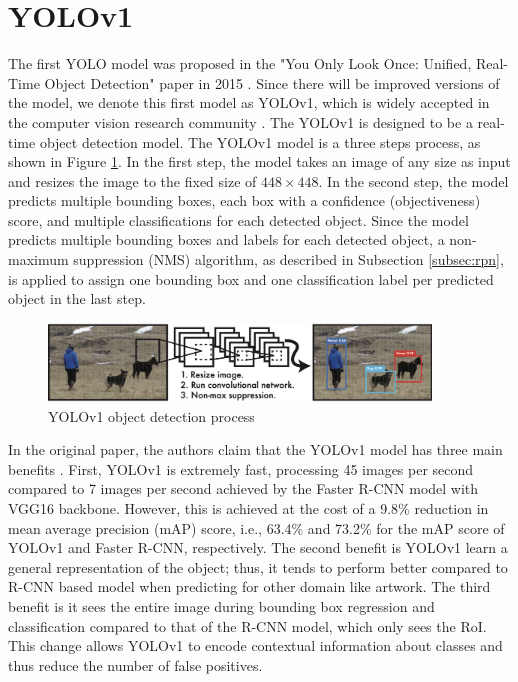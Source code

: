 \section{YOLOv1}  \label{sec:yolov1}

The first YOLO model was proposed in the "You Only Look Once: Uniﬁed, Real-Time Object Detection" paper in 2015 \cite{yolov1_2016}. Since there will be improved versions of the model, we denote this first model as YOLOv1, which is widely accepted in the computer vision research community \cite{understand_cnn_vs_yolo}. The YOLOv1 is designed to be a real-time object detection model. The YOLOv1 model is a three steps process, as shown in Figure \ref{fig:yolov1_process}. In the first step, the model takes an image of any size as input and resizes the image to the fixed size of $448 \times 448$. In the second step, the model predicts multiple bounding boxes, each box with a confidence (objectiveness) score, and multiple classifications for each detected object. Since the model predicts multiple bounding boxes and labels for each detected object, a non-maximum suppression (NMS) algorithm, as described in Subsection \ref{subsec:rpn}, is applied to assign one bounding box and one classification label per predicted object in the last step.

\begin{figure}[!ht]
    \centering
    \includegraphics[width=4in]{figures/yolov1_process.png}
    \caption{YOLOv1 object detection process \cite{yolov1_2016}} 
    \label{fig:yolov1_process}
\end{figure}

In the original paper, the authors claim that the YOLOv1 model has three main benefits \cite{yolov1_2016}. First, YOLOv1 is extremely fast, processing 45 images per second compared to 7 images per second achieved by the Faster R-CNN model with VGG16 backbone. However, this is achieved at the cost of a 9.8\% reduction in mean average precision (mAP) score, i.e., 63.4\% and 73.2\% for the mAP score of YOLOv1 and Faster R-CNN, respectively. The second benefit is YOLOv1 learn a general representation of the object; thus, it tends to perform better compared to R-CNN based model when predicting for other domain like artwork. The third benefit is it sees the entire image during bounding box regression and classification compared to that of the R-CNN model, which only sees the RoI. This change allows YOLOv1 to encode contextual information about classes and thus reduce the number of false positives.

